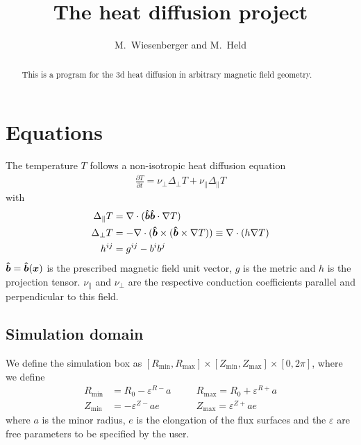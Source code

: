 





\title{The heat diffusion project}
\author{ M.~Wiesenberger and M.~Held}
\maketitle

\begin{abstract}
  This is a program for the 3d heat diffusion in arbitrary magnetic field
  geometry.
  \end{abstract}

\section{Equations}
The temperature $T$ follows a non-isotropic heat diffusion equation
\begin{align}
\frac{\partial T}{\partial t} = \nu_\perp \Delta_\perp T + \nu_\parallel\Delta_\parallel T
\label{eq:temperature}
\end{align}
with
\begin{align}
\Delta_\parallel T &= \nabla\cdot ( \bm{\hat{b}}\bm{\hat{b}}\cdot\nabla T) \\
\Delta_\perp T     &= -\nabla\cdot( \bm{\hat{b}}\times(\bm{\hat{b}}\times \nabla T)) \equiv \nabla\cdot (h \nabla T) \\
h^{ij} &= g^{ij} - b^ib^j
\end{align}
$\bm{\hat{b}} = \bm{\hat{b}}({\boldsymbol{x}})$ is the prescribed magnetic field unit vector, $g$ is the
metric and $h$ is the projection
tensor.
$\nu_\parallel$ and $\nu_\perp$ are the respective conduction
coefficients parallel and perpendicular to this field.

\subsection{Simulation domain}
We define the simulation box as
$[ R_{\min}, R_{\max}]\times [Z_{\min}, Z_{\max}] \times [0,2\pi]$,
where we define
\begin{align} \label{eq:box}
    R_{\min}&=R_0-\varepsilon^{R-}a\quad
    &&R_{\max}=R_0+\varepsilon^{R+}a\nonumber\\
    Z_{\min}&=-\varepsilon^{Z-}ae\quad
    &&Z_{\max}=\varepsilon^{Z+}ae
\end{align}
where $a$ is the minor radius, $e$ is the elongation of the flux surfaces and
the $\varepsilon$ are free parameters to be specified by the user.

